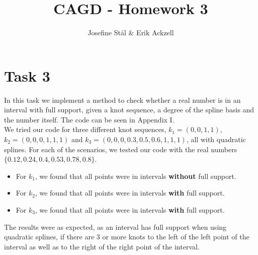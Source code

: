 \documentclass[]{article}
\title{CAGD - Homework 3}
\author{Josefine St{\aa}l \& Erik Ackzell}
\begin{document}
\maketitle
\section*{Task 3}
In this task we implement a method to check whether a real number is in an interval with full support, given a knot sequence, a degree of the spline basis and the number itself. The code can be seen in Appendix I. \\
We tried our code for three different knot sequences, $k_1=(0, 0, 1, 1)$, $k_2=(0, 0, 0, 1, 1, 1)$ and $k_3=(0, 0, 0, 0.3, 0.5, 0.6, 1, 1, 1)$, all with quadratic splines. For each of the scenarios, we tested our code with the real numbers $\{0.12, 0.24, 0.4, 0.53, 0.78, 0.8\}$.
\begin{itemize}
	\item For $k_1$, we found that all points were in intervals \textbf{without} full support.
	\item For $k_2$, we found that all points were in intervals \textbf{with} full support.
	\item For $k_3$, we found that all points were in intervals \textbf{with} full support.
\end{itemize}
The results were as expected, as an interval has full support when using quadratic splines, if there are 3 or more knots to the left of the left point of the interval as well as to the right of the right point of the interval.
\end{document}
